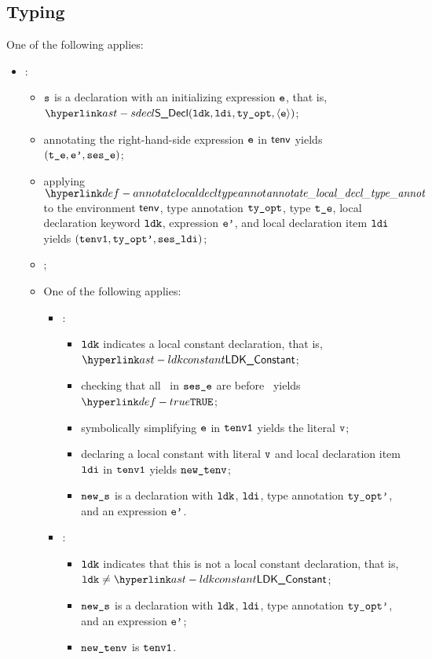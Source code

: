 \subsection{Typing}
\ProseParagraph
One of the following applies:
\begin{itemize}
  \item {}:
  \begin{itemize}
    \item $\texttt{s}$ is a declaration with an initializing expression $\texttt{e}$,
          that is, $\SDecl(\ldk, \ldi, \tyopt, \langle\ve\rangle)$;
    \item annotating the right-hand-side expression $\texttt{e}$ in $\textsf{tenv}$ yields $(\texttt{t\_e},\texttt{e'}, \texttt{ses\_e})$\ProseOrTypeError;
    \item applying $\annotatelocaldecltypeannot$ to the environment $\textsf{tenv}$, type annotation $\texttt{ty\_opt}$, type $\texttt{t\_e}$, local declaration keyword $\texttt{ldk}$, expression $\texttt{e'}$, and local declaration item $\texttt{ldi}$ yields $(\texttt{tenv1}, \texttt{ty\_opt'}, \texttt{ses\_ldi})$\ProseOrTypeError;
    \item {};
    \item One of the following applies:
    \begin{itemize}
      \item {}:
      \begin{itemize}
        \item $\texttt{ldk}$ indicates a local constant declaration, that is, $\LDKConstant$;
        \item checking that all \timeframesterm\ in $\texttt{ses\_e}$ are before \timeframeconstant\ yields $\True$\ProseOrTypeError;
        \item symbolically simplifying $\texttt{e}$ in $\texttt{tenv1}$ yields the literal $\texttt{v}$\ProseOrTypeError;
        \item declaring a local constant with literal $\texttt{v}$ and local declaration item $\texttt{ldi}$ in $\texttt{tenv1}$ yields $\texttt{new\_tenv}$;
        \item $\texttt{new\_s}$ is a declaration with $\texttt{ldk}$, $\texttt{ldi}$, type annotation $\texttt{ty\_opt'}$, and an expression $\texttt{e'}$.
      \end{itemize}

      \item {}:
      \begin{itemize}
        \item $\texttt{ldk}$ indicates that this is not a local constant declaration, that is, $\ldk\neq\LDKConstant$;
        \item $\texttt{new\_s}$ is a declaration with $\texttt{ldk}$, $\texttt{ldi}$, type annotation $\texttt{ty\_opt'}$, and an expression $\texttt{e'}$;
        \item $\texttt{new\_tenv}$ is $\texttt{tenv1}$.
      \end{itemize}
    \end{itemize}
  \end{itemize}


\end{itemize}
